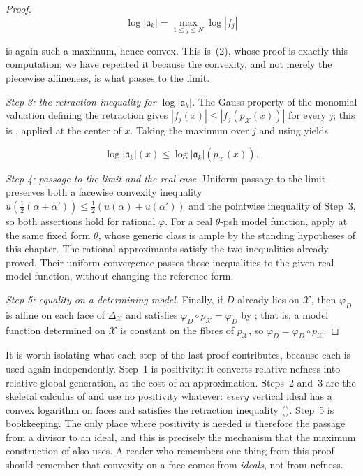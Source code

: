 \begin{proof}
\[
       \log|\mathfrak a_k|
       =\max_{1\leq j\leq N}\log|f_j|
\]

is again such a maximum, hence convex.  This is
\,(2), whose proof is exactly this
computation; we have repeated it because the convexity, and not merely the
piecewise affineness, is what passes to the limit.

\emph{Step 3: the retraction inequality for \(\log|\mathfrak a_k|\).}  The
Gauss property of the monomial valuation defining the retraction gives
\(|f_j(x)|\leq|f_j(p_{\mathcal X}(x))|\) for every \(j\); this is
, applied at the center of \(x\).  Taking the
maximum over \(j\) and using
 yields

\[
 \log|\mathfrak a_k|(x)
 \leq\log|\mathfrak a_k|(p_{\mathcal X}(x)).
\]

\emph{Step 4: passage to the limit and the real case.}  Uniform passage to
the limit preserves both a facewise convexity inequality
\(u(\tfrac12(\alpha+\alpha'))\leq\tfrac12(u(\alpha)+u(\alpha'))\) and the
pointwise inequality of Step~3, so both assertions hold for rational
\(\varphi\).  For a real \(\theta\)-psh model function, apply
 at the same fixed form
\(\theta\), whose generic class is ample by the standing hypotheses of
this chapter.  The rational approximants satisfy the two inequalities
already proved.  Their uniform convergence passes those inequalities to
the given real model function, without changing the reference form.

\emph{Step 5: equality on a determining model.}  Finally, if
\(D\) already lies on \(\mathcal X\), then \(\varphi_D\) is affine on each
face of \(\Delta_{\mathcal X}\) and satisfies
\(\varphi_D\circ p_{\mathcal X}=\varphi_D\) by
; that is, a model function determined on
\(\mathcal X\) is constant on the fibres of \(p_{\mathcal X}\), so
\(\varphi_D=\varphi_D\circ p_{\mathcal X}\).
\end{proof}

\begin{remark}
\label{rem:ch21-lemma-ingredients}
It is worth isolating what each step of the last proof contributes, because
each is used again independently.  Step~1 is positivity: it converts
relative nefness into relative global generation, at the cost of an
approximation.  Steps~2 and~3 are the skeletal calculus of
 and use no positivity whatever: \emph{every} vertical
ideal has a convex logarithm on faces and satisfies the retraction
inequality ().  Step~5 is bookkeeping.  The
only place where positivity is needed is therefore the passage from a
divisor to an ideal, and this is precisely the mechanism that the maximum
construction of  also uses.  A reader who
remembers one thing from this proof should remember that convexity on a face
comes from \emph{ideals}, not from nefness.
\end{remark}

